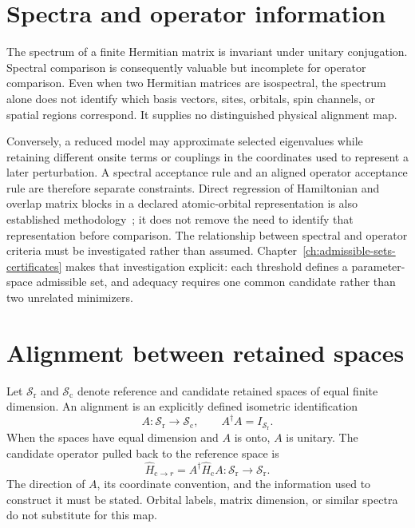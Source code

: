 \section{Spectra and operator information}


The spectrum of a finite Hermitian matrix is invariant under unitary
conjugation. Spectral comparison is consequently valuable but incomplete for
operator comparison. Even when two Hermitian matrices are isospectral, the
spectrum alone does not identify which basis vectors, sites, orbitals, spin
channels, or spatial regions correspond. It supplies no distinguished physical
alignment map.

Conversely, a reduced model may approximate selected eigenvalues while
retaining different onsite terms or couplings in the coordinates used to
represent a later perturbation. A spectral acceptance rule and an aligned
operator acceptance rule are therefore separate constraints. Direct regression
of Hamiltonian and overlap matrix blocks in a declared atomic-orbital
representation is also established methodology~\cite{zhangEtAl2022}; it does
not remove the need to identify that representation before comparison. The
relationship between spectral and operator criteria must be investigated
rather than assumed.
Chapter~\ref{ch:admissible-sets-certificates} makes that investigation explicit:
each threshold defines a parameter-space admissible set, and adequacy requires
one common candidate rather than two unrelated minimizers.

\section{Alignment between retained spaces}


Let $\mathcal S_{\mathrm r}$ and $\mathcal S_{\mathrm c}$ denote reference and
candidate retained spaces of equal finite dimension. An alignment is an
explicitly defined isometric identification
\begin{equation}
  A:\mathcal S_{\mathrm r}\longrightarrow\mathcal S_{\mathrm c},
  \qquad
  A^{\dagger}A=I_{\mathcal S_{\mathrm r}}.
\end{equation}
When the spaces have equal dimension and $A$ is onto, $A$ is unitary. The
candidate operator pulled back to the reference space is
\begin{equation}
  \widehat H_{\mathrm c\rightarrow r}
  =
  A^{\dagger}\widehat H_{\mathrm c}A
  :\mathcal S_{\mathrm r}\longrightarrow\mathcal S_{\mathrm r}.
\end{equation}
The direction of $A$, its coordinate convention, and the information used to
construct it must be stated. Orbital labels, matrix dimension, or similar
spectra do not substitute for this map.

